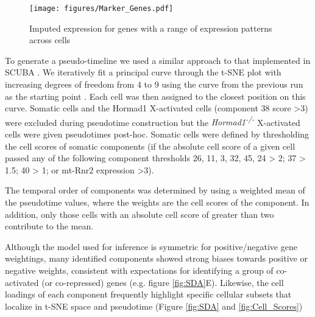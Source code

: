 \begin{figure}[H]
	\centering
	\texttt{[image: figures/Marker\_Genes.pdf]}
	\caption{Imputed expression for genes with a range of expression patterns across cells}
	\label{fig:Marker_Genes}
\end{figure}

To generate a pseudo-timeline we used a similar approach to that implemented in SCUBA \cite{Marco2014Bifurcation}. We iteratively fit a principal curve through the t-SNE plot with increasing degrees of freedom from 4 to 9 using the curve from the previous run as the starting point \cite{Hastie1989Principal}. Each cell was then assigned to the closest position on this curve. Somatic cells and the Hormad1 X-activated cells (component 38 score >3) were excluded during pseudotime construction but the \textit{Hormad1\textsuperscript{-/-}} X-activated cells were given pseudotimes post-hoc. Somatic cells were defined by thresholding the cell scores of somatic components (if the absolute cell score of a given cell passed any of the following component thresholds 26, 11, 3, 32, 45, 24 > 2; 37 > 1.5; 40 > 1; or mt-Rnr2 expression >3).

The temporal order of components was determined by using a weighted mean of the pseudotime values, where the weights are the cell scores of the component. In addition, only those cells with an absolute cell score of greater than two contribute to the mean.

Although the model used for inference is symmetric for positive/negative gene weightings, many identified components showed strong biases towards positive or negative weights, consistent with expectations for identifying a group of co-activated (or co-repressed) genes (e.g. figure \ref{fig:SDA}E). Likewise, the cell loadings of each component frequently highlight specific cellular subsets that localize in t-SNE space and pseudotime (Figure \ref{fig:SDA} and \ref{fig:Cell_Scores})

